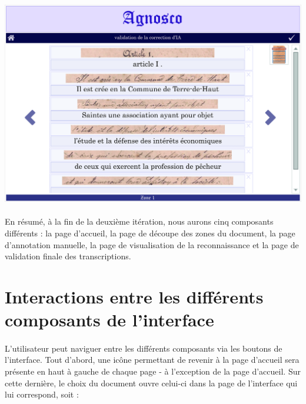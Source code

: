 \begin{mdframed}[frametitle={Figure 6 : Maquette de la page de validation finale lors de la deuxième itération}, innerbottommargin=10]
\begin{center}
\includegraphics[scale=0.04]{assets/maquetteIHMvalidationIA.jpg}
\end{center}
\end{mdframed}

\paragraph{}
En résumé, à la fin de la deuxième itération, nous aurons cinq composants différents : la page d’accueil, la page de découpe des zones du document, la page d’annotation manuelle, la page de visualisation de la reconnaissance et la page de validation finale des transcriptions.

\section{Interactions entre les différents composants de l'interface}

\paragraph{}
L’utilisateur peut naviguer entre les différents composants via les boutons de l’interface.
\newline{}
Tout d’abord, une icône permettant de revenir à la page d’accueil sera présente en haut à gauche de chaque page - à l’exception de la page d’accueil. Sur cette dernière, le choix du document ouvre celui-ci dans la page de l’interface qui lui correspond, soit :


